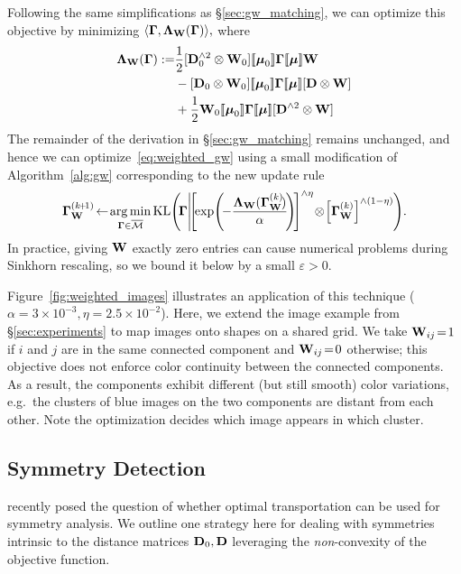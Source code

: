 Following the same simplifications as \S\ref{sec:gw_matching}, we can optimize this objective by minimizing $\langle\mathbf \Gamma,\mathbf \Lambda_\mathbf W(\mathbf \Gamma)\rangle,$ where
\begin{align*}
\bL_\bW(\G)\eqdef&
\frac{1}{2}[\D_0^{\wedge2}\otimes \bW_0]\diag{\bmu_0}\G\diag{\bmu}\bW
\\&- [\D_0\otimes \bW_0]\diag{\bmu_0}\G\diag{\bmu}[\D\otimes \bW]
\\ &+\frac{1}{2} \bW_0\diag{\bmu_0}\G\diag{\bmu} [\D^{\wedge2}\otimes \bW]
\end{align*}
The remainder of the derivation in \S\ref{sec:gw_matching} remains unchanged, and hence we can optimize~\eqref{eq:weighted_gw} using a small modification of Algorithm~\ref{alg:gw} corresponding to the new update rule
$$
\G^{(k\!+\!1)}_\bW\!\gets\!\argmin_{\G\in\bM}%
%
\KL\!\left(\!\G\!
\left|\!
\left[\!\exp\!\left(\!-\frac{\bL_\bW(\G^{(k)}_\bW\!)}{\alpha}\!\right)\!\right]^{\wedge\eta}\!\otimes\!\left[\G^{(k)}_\bW\right]^{\wedge(1-\eta)}\right.
\!\right)\!.
$$
In practice, giving $\mathbf W$ exactly zero entries can cause numerical problems during Sinkhorn rescaling, so we bound it below by a small $\varepsilon>0$.%

Figure~\ref{fig:weighted_images} illustrates an application of this technique ($\alpha\!=\!3\!\times\!10^{-3},\eta\!=\!2.5\!\times\!10^{-2}$).  Here, we extend the image example from \S\ref{sec:experiments} to map images onto shapes on a shared grid.  We take $\mathbf W_{ij}\!=\!1$ if $i$ and $j$ are in the same connected component and $\mathbf W_{ij}\!=\!0$ otherwise; this objective does not enforce color continuity between the connected components.  As a result, the components exhibit different (but still smooth) color variations, e.g.\ the clusters of blue images on the two components are distant from each other.  Note the optimization decides which image appears in which cluster.


\subsection{Symmetry Detection}\label{sec:symmetry}

\cite{pauly2015} recently posed the question of whether optimal transportation can be used for symmetry analysis.  We outline one strategy here for dealing with symmetries intrinsic to the distance matrices $\mathbf D_0,\mathbf D$ leveraging the \emph{non}-convexity of the \GWa objective function.

